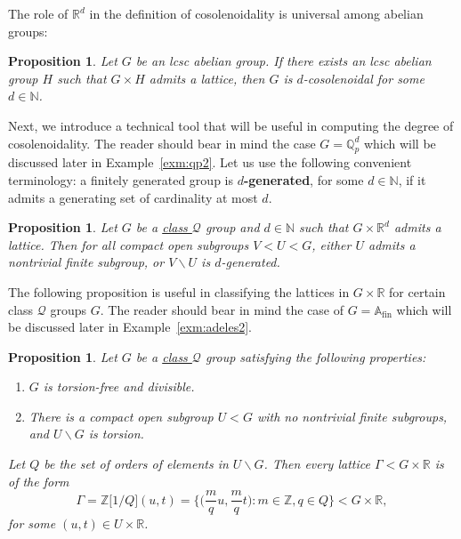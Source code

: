 \documentclass{amsart}
\numberwithin{equation}{subsection}
\newtheorem{prop}[thm]{Proposition}
\theoremstyle{remark}
\begin{document}
The role of \(\mathbb{R}^{d}\) in the definition of cosolenoidality is universal among abelian groups:

\begin{prop}\label{prop:cosoH}
Let \(G\) be an lcsc abelian group. If there exists an lcsc abelian group \(H\) such that \(G\times H\) admits a lattice, then \(G\) is \(d\)-cosolenoidal for some \(d\in\mathbb{N}\).
\end{prop}

Next, we introduce a technical tool that will be useful in computing the degree of cosolenoidality. The reader should bear in mind the case \(G=\mathbb{Q}_{p}^{d}\) which will be discussed later in Example~\ref{exm:qp2}. Let us use the following convenient terminology: a finitely generated group is {\bf \(d\)-generated}, for some \(d\in\mathbb{N}\), if it admits a generating set of cardinality at most \(d\).

\begin{prop}\label{prop:cyclicity}
Let \(G\) be a \hyperlink{classQ}{class \(\mathcal{Q}\)} group and \(d\in\mathbb{N}\) such that \(G\times\mathbb{R}^{d}\) admits a lattice. Then for all compact open subgroups \(V<U<G\), either \(U\) admits a nontrivial finite subgroup, or \(V\backslash U\) is \(d\)-generated.
\end{prop}

The following proposition is useful in classifying the lattices in \(G\times\mathbb{R}\) for certain class \(\mathcal{Q}\) groups \(G\). The reader should bear in mind the case of \(G=\mathbb{A}_{\mathrm{fin}}\) which will be discussed later in Example~\ref{exm:adeles2}.

\begin{prop}\label{prop:adlat}
Let \(G\) be a \hyperlink{classQ}{class \(\mathcal{Q}\)} group satisfying the following properties:
\begin{enumerate}
    \item \(G\) is torsion-free and divisible.
    \item There is a compact open subgroup \(U<G\) with no nontrivial finite subgroups, and \(U\backslash G\) is torsion.
\end{enumerate}
Let \(Q\) be the set of orders of elements in \(U\backslash G\). Then every lattice \(\Gamma< G\times\mathbb{R}\) is of the form
\[\Gamma=\mathbb{Z}\big[1/Q\big]\left(u,t\right)=\big\{ \big({\textstyle \frac{m}{q}}u,{\textstyle\frac{m}{q}}t\big):m\in\mathbb{Z},q\in Q\big\}<G\times\mathbb{R},\]
for some \(\left(u,t\right)\in U\times\mathbb{R}\).
\end{prop}
\end{document}

